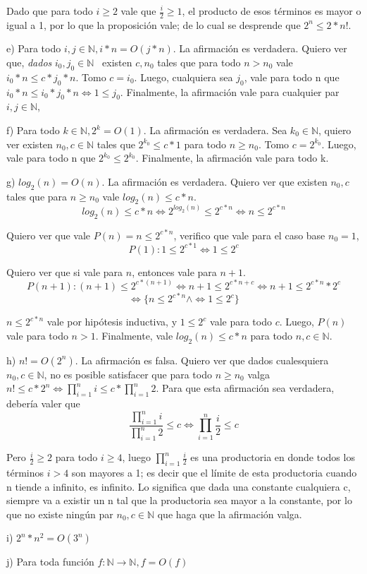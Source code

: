 \documentclass[11pt, spanish]{article}
\begin{document}
Dado que para todo $i\geq2$ vale que $\frac{i}{2}\geq1$, el producto de esos términos es mayor o igual a 1, por lo que la proposición vale; de lo cual se desprende que $2^n \leq 2*n!$.

\vspace{1em}
e) Para todo $i,j \in \mathbb{N}, i*n = O(j*n)$. La afirmación es verdadera. Quiero ver que, \emph{dados} $i_0,j_0 \in \mathbb{N}$ \ existen $c, n_0$ tales que para todo $n>n_0$ vale $i_0*n \leq c*j_0*n$. Tomo $c=i_0$. Luego, cualquiera sea $j_0$, vale para todo n que $i_0*n \leq i_0*j_0*n \iff 1 \leq j_0$. Finalmente, la afirmación vale para cualquier par $i,j \in \mathbb{N}$,

\vspace{1em}
f) Para todo $k \in \mathbb{N}, 2^k = O(1)$. La afirmación es verdadera. Sea $k_0 \in \mathbb{N}$, quiero ver existen $n_0, c \in \mathbb{N}$ tales que $2^{k_0} \leq c*1$ para todo $n\geq n_0$. Tomo $c=2^{k_0}$. Luego, vale para todo n que $2^{k_0} \leq 2^{k_0}$. Finalmente, la afirmación vale para todo k.

\vspace{1em}
g) $log_2(n) = O(n)$. La afirmación es verdadera. Quiero ver que existen $n_0, c$ tales que para $n\geq n_0$ vale $log_2(n) \leq c*n$.
\[
log_2(n) \leq c*n \iff 2^{log_2(n)} \leq 2^{c*n} \iff n \leq 2^{c*n}
\]

Quiero ver que vale $P(n) = n\leq 2^{c*n}$, verifico que vale para el caso base $n_0=1$,
\[
P(1): 1\leq 2^{c*1} \iff 1\leq 2^c
\]

Quiero ver que si vale para $n$, entonces vale para $n+1$.
\[
P(n+1): (n+1) \leq 2^{c*(n+1)}
\iff n+1 \leq 2^{c*n+c}
\iff n+1 \leq 2^{c*n} * 2^{c}
\]
\[
\iff \{
n \leq 2^{c*n} 
\land
\iff 1 \leq 2^{c}
\}
\]

$n \leq 2^{c*n}$ vale por hipótesis inductiva, y $1 \leq 2^{c}$ vale para todo $c$. Luego, $P(n)$ vale para todo $n>1$. Finalmente, vale $log_2(n) \leq c*n$ para todo $n,c \in \mathbb{N}$.

\vspace{1em}
h) $n! = O(2^n)$. La afirmación es falsa. Quiero ver que dados cualesquiera $n_0, c \in \mathbb{N}$, no es posible satisfacer que para todo $n\geq n_0$ valga $n! \leq c*2^n \iff \prod_{i=1}^{n}i \leq c*\prod_{i=1}^{n}2$. Para que esta afirmación sea verdadera, debería valer que \[
\frac{\prod_{i=1}^{n}i}{\prod_{i=1}^{n}2} \leq c
\iff
\prod_{i=1}^{n}{\frac{i}{2}} \leq c
\]

Pero $\frac{i}{2} \geq 2$ para todo $i\geq4$, luego $\prod_{i=1}^{n}{\frac{i}{2}}$ es una productoria en donde todos los términos $i>4$ son mayores a 1; es decir que el límite de esta productoria cuando n tiende a infinito, es infinito. Lo significa que dada una constante cualquiera c, siempre va a existir un n tal que la productoria sea mayor a la constante, por lo que no existe ningún par $n_0, c \in \mathbb{N}$ que haga que la afirmación valga.

\vspace{1em}
i) $2^n*n^2 = O(3^n)$

\vspace{1em}
j) Para toda función $f: \mathbb{N} \to \mathbb{N}, f=O(f)$
\end{document}

